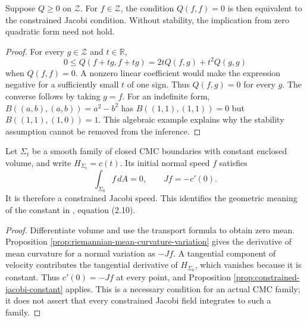 \begin{lemma}\label{lem:cmc-zero-form-nullspace}
Suppose $Q\geq0$ on $\mathcal Z$. For $f\in\mathcal Z$, the condition $Q(f,f)=0$ is then equivalent to the constrained Jacobi condition. Without stability, the implication from zero quadratic form need not hold.
\end{lemma}
\begin{proof}
For every $g\in\mathcal Z$ and $t\in\mathbb R$,
\[
 0\leq Q(f+tg,f+tg)=2tQ(f,g)+t^2Q(g,g)
\]
when $Q(f,f)=0$. A nonzero linear coefficient would make the expression negative for a sufficiently small $t$ of one sign. Thus $Q(f,g)=0$ for every $g$. The converse follows by taking $g=f$. For an indefinite form, $B((a,b),(a,b))=a^2-b^2$ has $B((1,1),(1,1))=0$ but $B((1,1),(1,0))=1$. This algebraic example explains why the stability assumption cannot be removed from the inference.
\end{proof}

\begin{proposition}\label{prop:cmc-family-jacobi}
Let $\Sigma_t$ be a smooth family of closed CMC boundaries with constant enclosed volume, and write $H_{\Sigma_t}=c(t)$. Its initial normal speed $f$ satisfies
\[
 \int_{\Sigma_0}f\,dA=0,\qquad Jf=-c'(0).
\]
It is therefore a constrained Jacobi speed. This identifies the geometric meaning of the constant in \cite{BdCE88}, equation (2.10).
\end{proposition}
\begin{proof}
Differentiate volume and use the transport formula to obtain zero mean. Proposition \ref{prop:riemannian-mean-curvature-variation} gives the derivative of mean curvature for a normal variation as $-Jf$. A tangential component of velocity contributes the tangential derivative of $H_{\Sigma_0}$, which vanishes because it is constant. Thus $c'(0)=-Jf$ at every point, and Proposition \ref{prop:constrained-jacobi-constant} applies. This is a necessary condition for an actual CMC family; it does not assert that every constrained Jacobi field integrates to such a family.
\end{proof}

